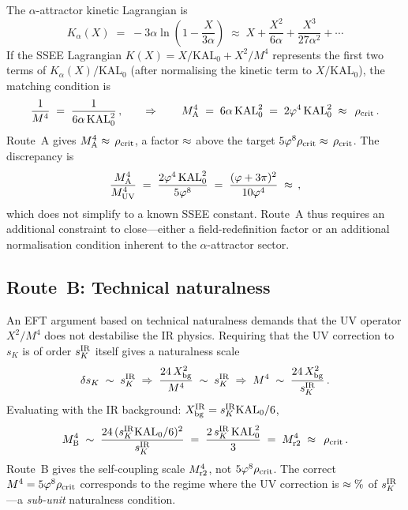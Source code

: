 \documentclass[12pt,a4paper]{article}
\newcommand{\phiG}{\varphi}
\newcommand{\KAL}{\mathrm{KAL}_0}
\newcommand{\sK}{s_K}
\newcommand{\rhoc}{\rho_{\rm crit}}
\begin{document}
The $\alpha$-attractor kinetic Lagrangian is
\begin{equation}
  K_\alpha(X) \;=\; -3\alpha\ln\!\left(1 - \frac{X}{3\alpha}\right)
  \;\approx\; X + \frac{X^2}{6\alpha} + \frac{X^3}{27\alpha^2} + \cdots
\end{equation}
If the SSEE Lagrangian $K(X) = X/\KAL + X^2/M^4$ represents the first two
terms of $K_\alpha(X)/\KAL$ (after normalising the kinetic term to
$X/\KAL$), the matching condition is
\begin{equation}
  \frac{1}{M^4} \;=\; \frac{1}{6\alpha\,\KAL^2}\,,
  \qquad\Rightarrow\qquad
  M^4_{\rm A} \;=\; 6\alpha\,\KAL^2 \;=\; 2\phiG^4\,\KAL^2
  \;\approx\; \val{seis_alfa_KAL2_d0}\,\rhoc\,.
  \label{eq:MA}
\end{equation}
Route~A gives $M^4_{\rm A} \approx \val{seis_alfa_KAL2_d0}\,\rhoc$, a factor $\approx \val{KAL_KALeff2_d3}$ above
the target $5\phiG^8\rhoc \approx \val{M4_UV_d1}\,\rhoc$.
The discrepancy is
\begin{equation}
  \frac{M^4_{\rm A}}{M^4_{\rm UV}} \;=\;
  \frac{2\phiG^4\,\KAL^2}{5\phiG^8}
  \;=\; \frac{(\phiG+3\pi)^2}{10\phiG^4}
  \;\approx\; \val{KAL_KALeff2_d3}\,,
\end{equation}
which does not simplify to a known SSEE constant.
Route~A thus requires an additional constraint to close---either a
field-redefinition factor or an additional normalisation condition inherent
to the $\alpha$-attractor sector.

\subsection{Route~B: Technical naturalness}

An EFT argument based on technical naturalness \citep{tHooft1980} demands
that the UV operator $X^2/M^4$ does not destabilise the IR physics.
Requiring that the UV correction to $\sK$ is of order $\sK^{\rm IR}$
itself gives a naturalness scale
\begin{equation}
  \delta\sK \;\sim\; \sK^{\rm IR}
  \;\Rightarrow\;
  \frac{24\,X_{\rm bg}^2}{M^4} \;\sim\; \sK^{\rm IR}
  \;\Rightarrow\;
  M^4 \;\sim\; \frac{24\,X_{\rm bg}^2}{\sK^{\rm IR}}\,.
\end{equation}
Evaluating with the IR background: $X_{\rm bg}^{\rm IR} = \sK^{\rm IR}\KAL/6$,
\begin{equation}
  M^4_{\rm B}
  \;\sim\; \frac{24\,(\sK^{\rm IR}\KAL/6)^2}{\sK^{\rm IR}}
  \;=\; \frac{2\,\sK^{\rm IR}\,\KAL^2}{3}
  \;=\; M^4_{\rm r2} \;\approx\; \val{M4_r2_d2}\,\rhoc\,.
\end{equation}
Route~B gives the self-coupling scale $M^4_{\rm r2}$, not $5\phiG^8\rhoc$.
The correct $M^4 = 5\phiG^8\rhoc$ corresponds to the regime where the UV
correction is $\approx \val{sK_UV_pct}\%$ of $\sK^{\rm IR}$---a \emph{sub-unit}
naturalness condition.
\end{document}
